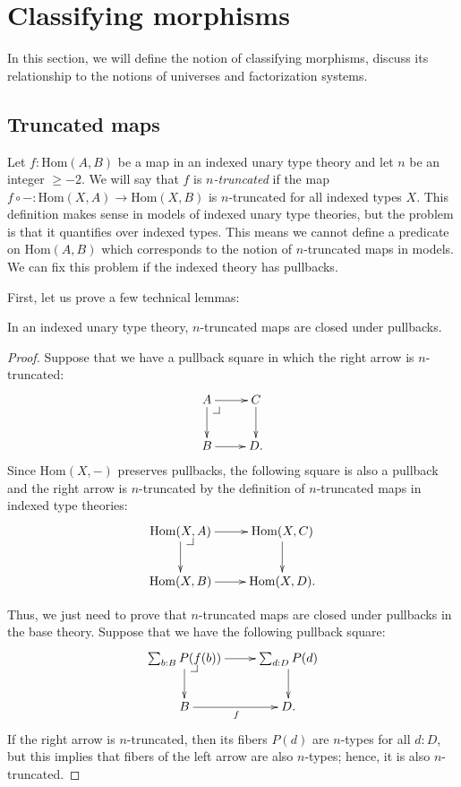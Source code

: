 \documentclass[reqno]{mscs}
\makeatletter
\newcommand{\fs}[1]{\mathrm{#1}}
\newcommand{\Hom}{\fs{Hom}}
\numberwithin{figure}{section}
\newcommand{\pb}[1][dr]{\save*!/#1-1.2pc/#1:(-1,1)@^{|-}\restore}
\makeatother
\begin{document}
\section{Classifying morphisms}
\label{sec:class}

In this section, we will define the notion of classifying morphisms, discuss its relationship to the notions of universes and factorization systems.

\subsection{Truncated maps}

Let $f : \Hom(A,B)$ be a map in an indexed unary type theory and let $n$ be an integer $\geq -2$.
We will say that $f$ is \emph{$n$-truncated} if the map $f \circ - : \Hom(X,A) \to \Hom(X,B)$ is $n$-truncated for all indexed types $X$.
This definition makes sense in models of indexed unary type theories, but the problem is that it quantifies over indexed types.
This means we cannot define a predicate on $\Hom(A,B)$ which corresponds to the notion of $n$-truncated maps in models.
We can fix this problem if the indexed theory has pullbacks.

First, let us prove a few technical lemmas:

\begin{lem}[trunc-pb]
In an indexed unary type theory, $n$-truncated maps are closed under pullbacks.
\end{lem}
\begin{proof}
Suppose that we have a pullback square in which the right arrow is $n$-truncated:
\[ \xymatrix{ A \ar[r] \ar[d] \pb   & C \ar[d] \\
              B \ar[r]              & D.
            } \]
Since $\Hom(X,-)$ preserves pullbacks, the following square is also a pullback and the right arrow is $n$-truncated by the definition of $n$-truncated maps in indexed type theories:
\[ \xymatrix{ \Hom(X,A) \ar[r] \ar[d] \pb   & \Hom(X,C) \ar[d] \\
              \Hom(X,B) \ar[r]              & \Hom(X,D).
            } \]

Thus, we just need to prove that $n$-truncated maps are closed under pullbacks in the base theory.
Suppose that we have the following pullback square:
\[ \xymatrix{ \sum_{b : B} P(f(b)) \ar[r] \ar[d] \pb    & \sum_{d : D} P(d) \ar[d] \\
              B \ar[r]_f                                & D.
            } \]
If the right arrow is $n$-truncated, then its fibers $P(d)$ are $n$-types for all $d : D$, but this implies that fibers of the left arrow are also $n$-types; hence, it is also $n$-truncated.
\end{proof}
\end{document}
